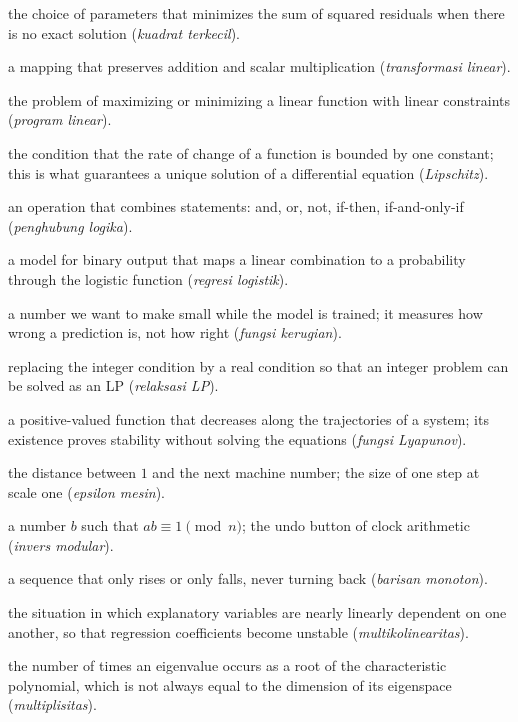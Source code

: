 \begin{description}[style=nextline,itemsep=0.35em]
  \item[Least squares] the choice of parameters that minimizes the sum of squared residuals when there is no exact solution (\emph{kuadrat terkecil}).
  \item[Linear map] a mapping that preserves addition and scalar multiplication (\emph{transformasi linear}).
  \item[Linear program] the problem of maximizing or minimizing a linear function with linear constraints (\emph{program linear}).
  \item[Lipschitz condition] the condition that the rate of change of a function is bounded by one constant; this is what guarantees a unique solution of a differential equation (\emph{Lipschitz}).
  \item[Logical connective] an operation that combines statements: and, or, not, if-then, if-and-only-if (\emph{penghubung logika}).
  \item[Logistic regression] a model for binary output that maps a linear combination to a probability through the logistic function (\emph{regresi logistik}).
  \item[Loss function] a number we want to make small while the model is trained; it measures how wrong a prediction is, not how right (\emph{fungsi kerugian}).
  \item[LP relaxation] replacing the integer condition by a real condition so that an integer problem can be solved as an LP (\emph{relaksasi LP}).
  \item[Lyapunov function] a positive-valued function that decreases along the trajectories of a system; its existence proves stability without solving the equations (\emph{fungsi Lyapunov}).
  \item[Machine epsilon] the distance between $1$ and the next machine number; the size of one step at scale one (\emph{epsilon mesin}).
  \item[Modular inverse] a number $b$ such that $ab\equiv 1 \pmod n$; the undo button of clock arithmetic (\emph{invers modular}).
  \item[Monotone sequence] a sequence that only rises or only falls, never turning back (\emph{barisan monoton}).
  \item[Multicollinearity] the situation in which explanatory variables are nearly linearly dependent on one another, so that regression coefficients become unstable (\emph{multikolinearitas}).
  \item[Multiplicity] the number of times an eigenvalue occurs as a root of the characteristic polynomial, which is not always equal to the dimension of its eigenspace (\emph{multiplisitas}).

\end{description}
